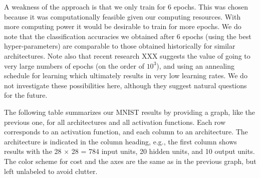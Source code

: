 \documentclass[10pt]{article}
\begin{document}
%
%

A weakness of the approach is that we only train for 6 epochs.  This
was chosen because it was computationally feasible given our computing
resources.  With more computing power it would be desirable to train
for more epochs.  We do note that the classification accuracies we
obtained after 6 epochs (using the best hyper-parameters) are
comparable to those obtained historically for similar architectures.
Note also that recent research XXX suggests the value of going to very
large numbers of epochs (on the order of $10^3$), and using an
annealing schedule for learning which ultimately results in very low
learning rates.  We do not investigate these possibilities here,
although they suggest natural questions for the future.

% 

The following table summarizes our MNIST results by providing a graph,
like the previous one, for all architectures and all activation
functions. Each row corresponds to an activation function, and each
column to an architecture.  The architecture is indicated in the
column heading, e.g., the first column shows results with the 28
$\times$ 28 = 784 input units, 20 hidden units, and 10 output units.
The color scheme for cost and the axes are the same as in the previous
graph, but left unlabeled to avoid clutter.
\end{document}
